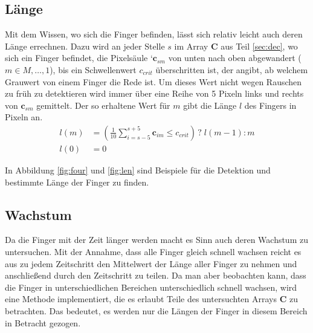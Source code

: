 \subsection{Länge}
\label{sec:lan}
Mit dem Wissen, wo sich die Finger befinden, lässt sich relativ leicht auch deren Länge errechnen. Dazu wird an jeder Stelle $s$ im Array $\mathbf{C}$ aus Teil \ref{sec:dec}, wo sich ein Finger befindet, die Pixelsäule `$\mathbf{c}_{sm}$ von unten nach oben abgewandert ($m \in M, \dots, 1$), bis ein Schwellenwert $c_{crit}$ überschritten ist, der angibt, ab welchem Grauwert von einem Finger die Rede ist. Um dieses Wert nicht wegen Rauschen zu früh zu detektieren wird immer über eine Reihe von 5 Pixeln links und rechts von $\mathbf{c}_{sm}$ gemittelt. Der so erhaltene Wert für $m$ gibt die Länge $l$ des Fingers in Pixeln an.
\begin{align}
 l(m) &= \left(\frac{1}{10}\sum_{i=s-5}^{s+5} \mathbf{c}_{im} \leq c_{crit} \right) \, ? \; l(m-1) : m \\
 l(0) &= 0
\end{align}

In Abbildung \ref{fig:four} und \ref{fig:len} sind Beispiele für die Detektion und bestimmte Länge der Finger zu finden.

\subsection{Wachstum}
\label{sec:grow}
Da die Finger mit der Zeit länger werden macht es Sinn auch deren Wachstum zu untersuchen. Mit der Annahme, dass alle Finger gleich schnell wachsen reicht es aus zu jedem Zeitschritt den Mittelwert der Länge aller Finger zu nehmen und anschließend durch den Zeitschritt zu teilen. Da man aber beobachten kann, dass die Finger in unterschiedlichen Bereichen unterschiedlich schnell wachsen, wird eine Methode implementiert, die es erlaubt Teile des untersuchten Arrays $\mathbf{C}$ zu betrachten. Das bedeutet, es werden nur die Längen der Finger in diesem Bereich in Betracht gezogen. 